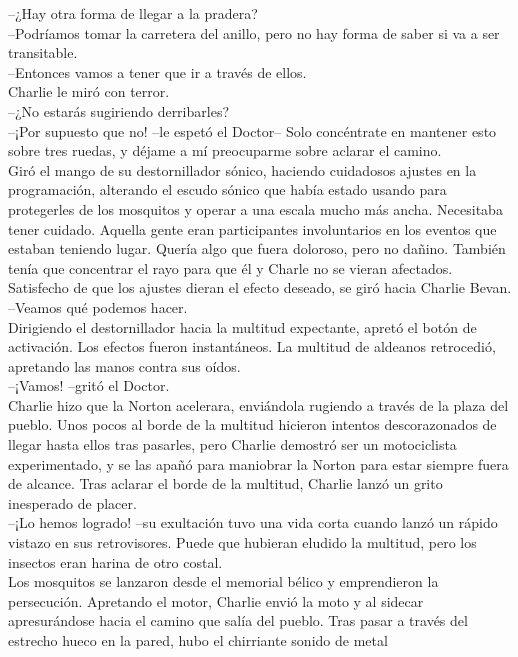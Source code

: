 --¿Hay otra forma de llegar a la pradera?\\
--Podríamos tomar la carretera del anillo, pero no hay forma de saber si
va a ser transitable.\\
--Entonces vamos a tener que ir a través de ellos.\\
Charlie le miró con terror.\\
--¿No estarás sugiriendo derribarles?\\
--¡Por supuesto que no! --le espetó el Doctor-- Solo concéntrate en
mantener esto sobre tres ruedas, y déjame a mí preocuparme sobre aclarar
el camino.\\
Giró el mango de su destornillador sónico, haciendo cuidadosos ajustes
en la programación, alterando el escudo sónico que había estado usando
para protegerles de los mosquitos y operar a una escala mucho más ancha.
Necesitaba tener cuidado. Aquella gente eran participantes involuntarios
en los eventos que estaban teniendo lugar. Quería algo que fuera
doloroso, pero no dañino. También tenía que concentrar el rayo para que
él y Charle no se vieran afectados.\\
Satisfecho de que los ajustes dieran el efecto deseado, se giró hacia
Charlie Bevan.\\
--Veamos qué podemos hacer.\\
Dirigiendo el destornillador hacia la multitud expectante, apretó el
botón de activación. Los efectos fueron instantáneos. La multitud de
aldeanos retrocedió, apretando las manos contra sus oídos.\\
--¡Vamos! --gritó el Doctor.\\
Charlie hizo que la Norton acelerara, enviándola rugiendo a través de la
plaza del pueblo. Unos pocos al borde de la multitud hicieron intentos
descorazonados de llegar hasta ellos tras pasarles, pero Charlie
demostró ser un motociclista experimentado, y se las apañó para
maniobrar la Norton para estar siempre fuera de alcance. Tras aclarar el
borde de la multitud, Charlie lanzó un grito inesperado de placer.\\
--¡Lo hemos logrado! --su exultación tuvo una vida corta cuando lanzó un
rápido vistazo en sus retrovisores. Puede que hubieran eludido la
multitud, pero los insectos eran harina de otro costal.\\
Los mosquitos se lanzaron desde el memorial bélico y emprendieron la
persecución. Apretando el motor, Charlie envió la moto y al sidecar
apresurándose hacia el camino que salía del pueblo. Tras pasar a través
del estrecho hueco en la pared, hubo el chirriante sonido de metal
